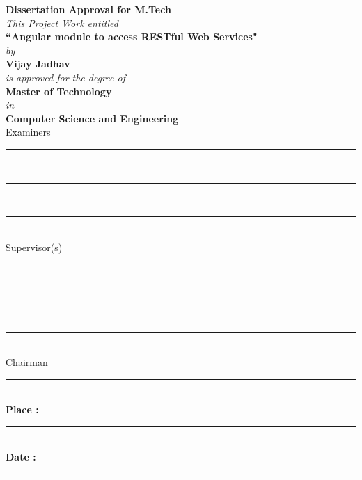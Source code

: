 
\begin{center}
{\LARGE{ \textbf{ Dissertation Approval for M.Tech}}}\\
\vspace{0.7in}
{\em This Project Work entitled}\\

\large{\textbf{``Angular module to access RESTful Web Services"} }\\
{\em{by} }\\

{\large{\textbf{Vijay Jadhav}}}\\
{\em{is approved for the degree of}}\\
{\large{\textbf{Master of Technology}}} \\
{\em{in}}\\
{\large{\textbf{Computer Science and Engineering}}}\\

\vspace*{0.3in}
Examiners\\
\rule{15em}{0.3pt}\\
\rule{15em}{0.3pt}\\
\rule{15em}{0.3pt}\\

\vspace*{0.3in}
Supervisor(s)\\
\rule{15em}{0.3pt}\\
\rule{15em}{0.3pt}\\
\rule{15em}{0.3pt}\\


\vspace*{0.3in}
Chairman\\
\rule{15em}{0.3pt}\\

\vspace*{0.3in}
\textbf{Place : }\rule{12em}{0.3pt} \\
\textbf{Date : }\rule{12em}{0.3pt} \\
\end{center}

